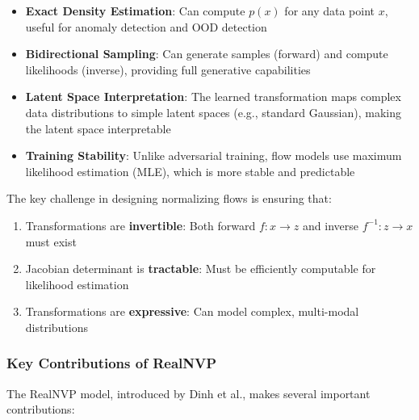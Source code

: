 \documentclass[conference,12pt]{IEEEtran}
\begin{document}
\begin{itemize}
    \item \textbf{Exact Density Estimation}: Can compute $p(x)$ for any data point $x$, useful for anomaly detection and OOD detection
    \item \textbf{Bidirectional Sampling}: Can generate samples (forward) and compute likelihoods (inverse), providing full generative capabilities
    \item \textbf{Latent Space Interpretation}: The learned transformation maps complex data distributions to simple latent spaces (e.g., standard Gaussian), making the latent space interpretable
    \item \textbf{Training Stability}: Unlike adversarial training, flow models use maximum likelihood estimation (MLE), which is more stable and predictable
\end{itemize}

The key challenge in designing normalizing flows is ensuring that:
\begin{enumerate}
    \item Transformations are \textbf{invertible}: Both forward $f: x \rightarrow z$ and inverse $f^{-1}: z \rightarrow x$ must exist
    \item Jacobian determinant is \textbf{tractable}: Must be efficiently computable for likelihood estimation
    \item Transformations are \textbf{expressive}: Can model complex, multi-modal distributions
\end{enumerate}

\subsubsection{Key Contributions of RealNVP}

The RealNVP model, introduced by Dinh et al., makes several important contributions:
\end{document}
